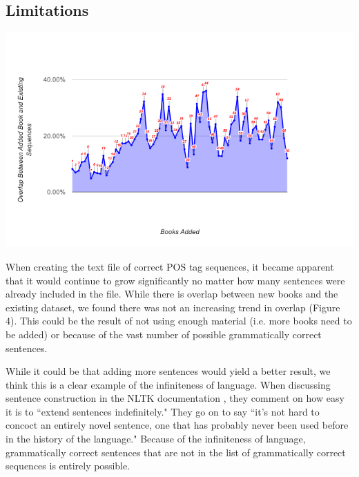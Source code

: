 \documentclass[11pt,a4paper]{article}
\begin{document}
\begin{multicols}{2}
\section{Limitations}
\begin{center} 
   \centering
   \includegraphics[width=\linewidth]{bookOverlap}
\end{center}

When creating the text file of correct POS tag sequences, it became apparent that it would continue to grow significantly no matter how many sentences were already included in the file. While there is overlap between new books and the existing dataset, we found there was not an increasing trend in overlap (Figure 4). This could be the result of not using enough material (i.e. more books need to be added) or because of the vast number of possible grammatically correct sentences.

While it could be that adding more sentences would yield a better result, we think this is a clear example of the infiniteness of language. When discussing sentence construction in the NLTK documentation \cite{nltk}, they comment on how easy it is to ``extend sentences indefinitely." They go on to say ``it's not hard to concoct an entirely novel sentence, one that has probably never been used before in the history of the language." Because of the infiniteness of language, grammatically correct sentences that are not in the list of grammatically correct sequences is entirely possible.


\end{multicols}
\end{document}
